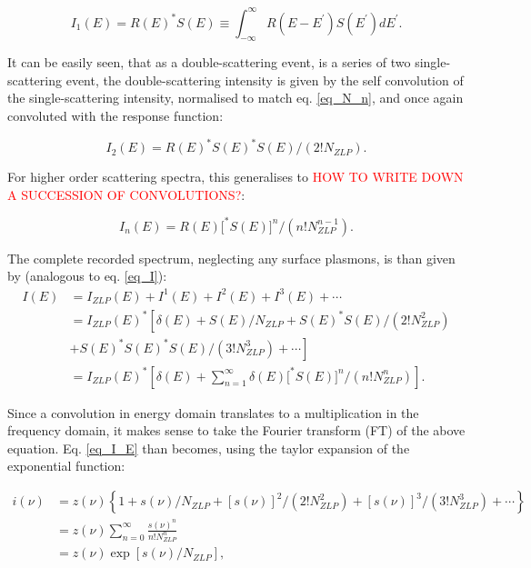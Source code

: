 \begin{equation} \label{eq_I_1}
    I_{1}(E)=R(E)^{*} S(E) \equiv \int_{-\infty}^{\infty} R\left(E-E^{\prime}\right) S\left(E^{\prime}\right) d E^{\prime}.
\end{equation}


It can be easily seen, that as a double-scattering event, is a series of two single-scattering event, the double-scattering intensity is given by the self convolution of the single-scattering intensity, normalised to match eq. \eqref{eq_N_n}, and once again convoluted with the response function:

\begin{equation}
    I_{2}(E)=R(E)^{*} S(E)^{*} S(E) /\left(2 ! N_{ZLP}\right).
\end{equation}

For higher order scattering spectra, this generalises to \textcolor{red}{HOW TO WRITE DOWN A SUCCESSION OF CONVOLUTIONS?}:


\begin{equation} \label{eq_def_I_n}
    I_{n}(E)=R(E)\big[^{*} S(E)\big]^{n} /\left(n ! N_{ZLP}^{n-1}\right).
\end{equation}

The complete recorded spectrum, neglecting any surface plasmons, is than given by (analogous to eq. \eqref{eq_I}):
\begin{equation} \label{eq_I_E}
    \begin{aligned}
        I(E) &=I_{ZLP}(E)+I^{1}(E)+I^{2}(E)+I^{3}(E)+\cdots \\
        &=I_{ZLP}(E)^{*}\left[\delta(E)+S(E) / N_{ZLP}+S(E)^{*} S(E) /\left(2 ! N_{ZLP}^{2}\right)\right.\\
        &\left.+S(E)^{*} S(E)^{*} S(E) /\left(3 ! N_{ZLP}^{3}\right)+\cdots\right]\\
        &= I_{ZLP}(E)^{*}\left[\delta(E)+ \sum_{n=1}^\infty \delta(E)\big[^{*} S(E)\big]^{n} /\left(n ! N_{ZLP}^{n}\right) \right].
        \end{aligned}
\end{equation}

Since a convolution in energy domain translates to a multiplication in the frequency domain, it makes sense to take the Fourier transform (FT) of the above equation. Eq. \eqref{eq_I_E} than becomes, using the taylor expansion of the exponential function:

\begin{equation}\label{eq_i_nu_exp}
    \begin{aligned}
i(\nu) &=z(\nu)\left\{1+s(\nu) / N_{ZLP}+[s(\nu)]^{2} /\left(2 ! N_{ZLP}^{2}\right)+[s(\nu)]^{3} /\left(3 ! N_{ZLP}^{3}\right)+\cdots\right\} \\
&=z(\nu)\sum_{n=0}^\infty\frac{s(\nu)^n}{n! N_{ZLP}^n}\\
&=z(\nu) \exp \left[s(\nu) / N_{ZLP}\right],
\end{aligned}
\end{equation}

